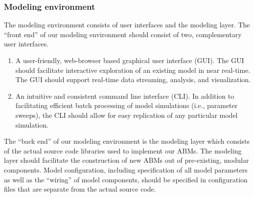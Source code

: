 \documentclass[11pt]{amsart}
\begin{document}
\subsubsection{Modeling environment}
The modeling environment consists of user interfaces and the modeling layer. The ``front end'' of our modeling environment should consist of two, complementary user interfaces.
\begin{enumerate}
    \item A user-friendly, web-browser based graphical user interface (GUI). The GUI should facilitate interactive exploration of an existing model in near real-time.  The GUI should support real-time data streaming, analysis, and visualization.
    \item An intuitive and consistent command line interface (CLI). In addition to facilitating efficient batch processing of model simulations (i.e., parameter sweeps), the CLI should allow for easy replication of any particular model simulation.
\end{enumerate}
The ``back end'' of our modeling environment is the modeling layer which consists of the actual source code libraries used to implement our ABMs. The modeling layer should facilitate the construction of new ABMs out of pre-existing, modular components.  Model configuration, including specification of all model parameters as well as the ``wiring'' of model components, should be specified in configuration files that are separate from the actual source code.
\end{document}
